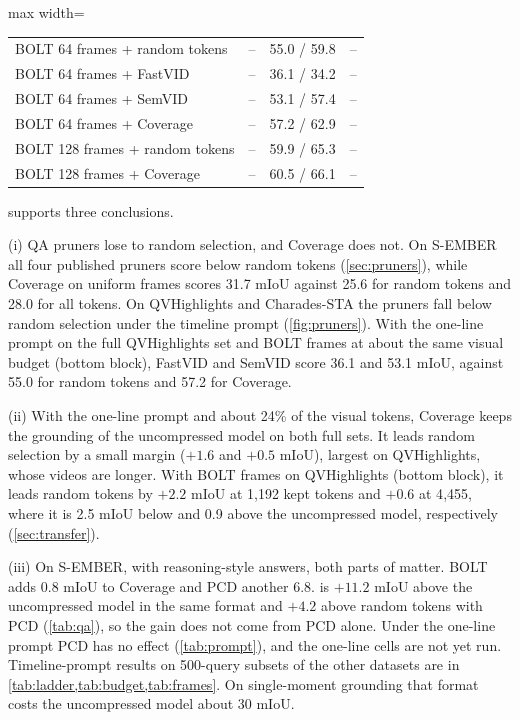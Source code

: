 \begin{table}[t]
\begin{adjustbox}{max width=\linewidth}
\begin{tabular}{@{}lccc@{}}
    \midrule
    BOLT 64 frames + random tokens   & -- & 55.0 / 59.8 & -- \\
    BOLT 64 frames + FastVID         & -- & 36.1 / 34.2 & -- \\
    BOLT 64 frames + SemVID          & -- & 53.1 / 57.4 & -- \\
    BOLT 64 frames + Coverage        & -- & 57.2 / 62.9 & -- \\
    BOLT 128 frames + random tokens  & -- & 59.9 / 65.3 & -- \\
    BOLT 128 frames + Coverage       & -- & 60.5 / 66.1 & -- \\
    \bottomrule
  \end{tabular}\end{adjustbox}
\end{table}

 supports three conclusions.

(i) QA pruners lose to random selection, and Coverage does not. On S-EMBER all four published pruners score below
random tokens (\cref{sec:pruners}), while Coverage on uniform frames scores 31.7 mIoU against 25.6 for random tokens
and 28.0 for all tokens. On QVHighlights and Charades-STA the pruners fall below random selection under the timeline
prompt (\cref{fig:pruners}). With the one-line prompt on the full QVHighlights set and BOLT frames at about the same
visual budget (bottom block), FastVID and SemVID score 36.1 and 53.1 mIoU, against 55.0 for random tokens and 57.2 for
Coverage.

(ii) With the one-line prompt and about 24\% of the visual tokens, Coverage keeps the grounding of the uncompressed
model on both full sets. It leads random selection by a small margin ($+1.6$ and $+0.5$ mIoU), largest on
QVHighlights, whose videos are longer. With BOLT frames on QVHighlights (bottom block), it leads random tokens by
$+2.2$ mIoU at 1{,}192 kept tokens and $+0.6$ at 4{,}455, where it is 2.5 mIoU below and 0.9 above the uncompressed
model, respectively (\cref{sec:transfer}).

(iii) On S-EMBER, with reasoning-style answers, both parts of \method matter. BOLT adds 0.8 mIoU to Coverage and PCD
another 6.8. \method is $+11.2$ mIoU above the uncompressed model in the same format and $+4.2$ above random tokens
with PCD (\cref{tab:qa}), so the gain does not come from PCD alone. Under the one-line prompt PCD has no effect
(\cref{tab:prompt}), and the one-line \method cells are not yet run. Timeline-prompt results on 500-query subsets of
the other datasets are in \cref{tab:ladder,tab:budget,tab:frames}. On single-moment grounding that format costs the
uncompressed model about 30 mIoU.

